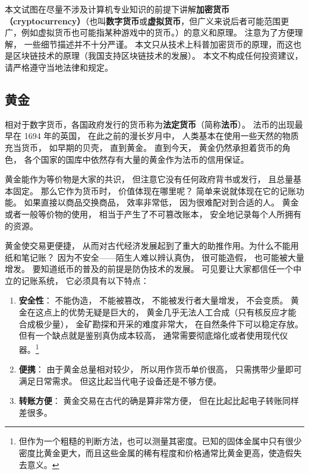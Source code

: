 
本文试图在尽量不涉及计算机专业知识的前提下讲解\textbf{加密货币（cryptocurrency）}（也叫\textbf{数字货币}或\textbf{虚拟货币}，但广义来说后者可能范围更广，例如虚拟货币也可能指某种游戏中的货币。）的意义和原理。 注意为了方便理解， 一些细节描述并不十分严谨。 本文只从技术上科普加密货币的原理，而这也是区块链技术的原理（我国支持区块链技术的发展）。 本文不构成任何投资建议， 请严格遵守当地法律和规定。

\subsection{黄金}
相对于数字货币，各国政府发行的货币称为\textbf{法定货币}（简称\textbf{法币}）。 法币的出现最早在 1694 年的英国， 在此之前的漫长岁月中， 人类基本在使用一些天然的物质充当货币， 如早期的贝壳， 直到黄金。 直到今天， 黄金仍然承担着货币的角色， 各个国家的国库中依然存有大量的黄金作为法币的信用保证。

黄金能作为等价物是大家的共识， 但注意它没有任何政府背书或发行， 且总量基本固定。 那么它作为货币时， 价值体现在哪里呢？ 简单来说就体现在它的记账功能。 如果直接以商品交换商品， 效率非常低， 因为很难配对到合适的人。 黄金或者一般等价物的使用， 相当于产生了不可篡改账本， 安全地记录每个人所拥有的资源。

黄金使交易更便捷， 从而对古代经济发展起到了重大的助推作用。为什么不能用纸和笔记账？ 因为不安全——陌生人难以辨认真伪， 很可能造假， 也可能被大量增发。 要知道纸币的普及的前提是防伪技术的发展。 可见要让大家都信任一个中立的记账系统， 它必须具有以下特点：
\begin{enumerate}
\item \textbf{安全性}： 不能伪造， 不能被篡改， 不能被发行者大量增发， 不会变质。 黄金在这点上的优势无疑是巨大的， 黄金几乎无法人工合成（只有核反应才能合成极少量）， 金矿勘探和开采的难度非常大， 在自然条件下可以稳定存放。 但有一个缺点就是鉴别真伪成本较高， 通常需要彻底熔化或者使用现代仪器。\footnote{但作为一个粗糙的判断方法，也可以测量其密度。已知的固体金属中只有很少密度比黄金更大，而且这些金属的稀有程度和价格通常比黄金更高，使造假失去意义。}
\item \textbf{便携}： 由于黄金总量相对较少， 所以用作货币单价很高， 只需携带少量即可满足日常需求。 但这比起当代电子设备还是不够方便。
\item \textbf{转账方便}： 黄金交易在古代的确是算非常方便， 但在比起比起电子转账同样差很多。
\end{enumerate}

